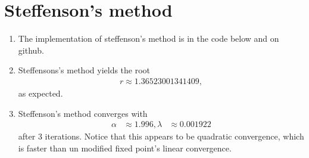 \documentclass[10pt]{article}
\begin{document}
\section{Steffenson's method}
\begin{enumerate}
\item The implementation of steffenson's method is in the code below and on github.

\item Steffensons's method yields the root \begin{align*}
    r \approx 1.36523001341409,
\end{align*} as expected.

\item Steffenson's method converges with \begin{align*}
    \alpha &\approx 1.996,
    \lambda &\approx 0.001922
\end{align*} after 3 iterations. Notice that this appears to be quadratic convergence, which is faster than un modified fixed point's linear convergence.
\end{enumerate}

{\small }   
\end{document}
